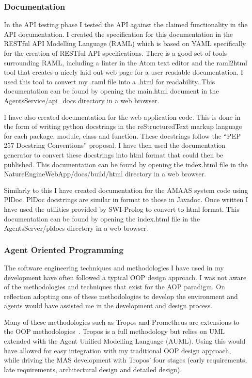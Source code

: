\documentclass[]{final_report}
\begin{document}
\subsubsection{Documentation}
In the API testing phase I tested the API against the claimed functionality in the API documentation. I created the specification for this documentation in the RESTful API Modelling Language (RAML) which is based on YAML specifically for the creation of RESTful API specifications. There is a good set of tools surrounding RAML, including a linter in the Atom text editor and the raml2html tool that creates a nicely laid out web page for a user readable documentation. I used this tool to convert my .raml file into a .html for readability. This documentation can be found by opening the main.html document in the AgentsService/api\_docs directory in a web browser.\par 
I have also created documentation for the web application code. This is done in the form of writing python docstrings in the reStructuredText markup language for each package, module, class and function. These docstrings follow the ``PEP 257 Docstring Conventions'' proposal. I have then used the documentation generator to convert these docstrings into html format that could then be published. This documentation can be found by opening the index.html file in the NatureEngineWebApp/docs/build/html directory in a web browser.\par 
Similarly to this I have created documentation for the AMAAS system code using PlDoc. PlDoc docstrings are similar in format to those in Javadoc. Once written I have used the utilities provided by SWI-Prolog to convert to html format. This documentation can be found by opening the index.html file in the AgentsServer/pldocs directory in a web browser.

\subsubsection{Agent Oriented Programming}
The software engineering techniques and methodologies I have used in my development have often followed a typical OOP design approach. I was not aware of the methodologies and techniques that exist for the AOP paradigm. On reflection adopting one of these methodologies to develop the environment and agents would have assisted me in the development and design process.\par 
Many of these methodologies such as Tropos and Prometheus are extensions to the OOP methodologies~\cite{kostas_deductive}. Tropos is a full methodology but relies on UML extended with the Agent Unified Modelling Language (AUML). Using this would have allowed for easy integration with my traditional OOP design approach, while driving the MAS development with Tropos' four stages (early requirements, late requirements, architectural design and detailed design).
\end{document}
